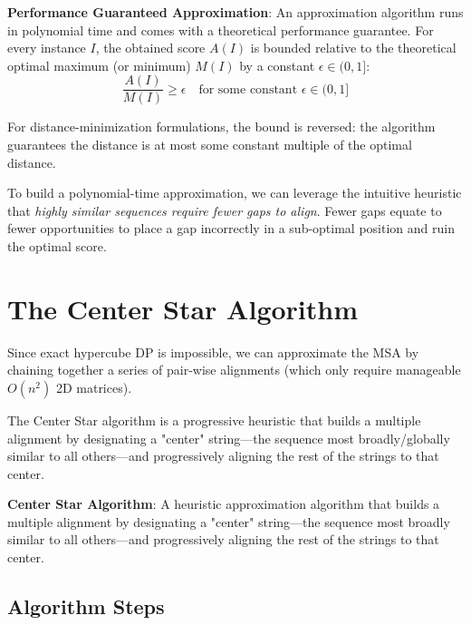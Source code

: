 \begin{important}
    \textbf{Performance Guaranteed Approximation}: An approximation algorithm runs in polynomial time and comes with a theoretical performance guarantee. For every instance $I$, the obtained score $A(I)$ is bounded relative to the theoretical optimal maximum (or minimum) $M(I)$ by a constant $\epsilon \in (0, 1]$:
    \[
    \frac{A(I)}{M(I)} \geq \epsilon \quad \text{for some constant } \epsilon \in (0, 1]
    \]
\end{important}
For distance-minimization formulations, the bound is reversed: the algorithm guarantees the distance is at most some constant multiple of the optimal distance.

To build a polynomial-time approximation, we can leverage the intuitive heuristic that \textit{highly similar sequences require fewer gaps to align}. Fewer gaps equate to fewer opportunities to place a gap incorrectly in a sub-optimal position and ruin the optimal score.

\section{The Center Star Algorithm}

Since exact hypercube DP is impossible, we can approximate the MSA by chaining together a series of pair-wise alignments (which only require manageable $O(n^2)$ 2D matrices).

The Center Star algorithm is a progressive heuristic that builds a multiple alignment by designating a "center" string—the sequence most broadly/globally similar to all others—and progressively aligning the rest of the strings to that center.

\begin{important}
    \textbf{Center Star Algorithm}: A heuristic approximation algorithm that builds a multiple alignment by designating a "center" string—the sequence most broadly similar to all others—and progressively aligning the rest of the strings to that center.
\end{important}

\subsection{Algorithm Steps}

